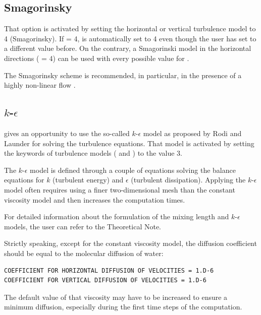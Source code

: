 \subsection{Smagorinsky}

That option is activated by setting the horizontal or vertical turbulence
model to 4 (Smagorinsky).
If  = 4,
 is automatically set to 4
even though the user has set to a different value before.
On the contrary, a Smagorinski model in the horizontal directions
( = 4) can be used with every possible
value for .

The Smagorinsky scheme is recommended, in particular, in the presence of a
highly non-linear flow \cite{Smagorinsky1963}.


\subsection{$k$-$\epsilon$}

 gives an opportunity to use the so-called $k$-$\epsilon$
model as proposed by Rodi and Launder for solving the turbulence equations.
That model is activated by setting the keywords of turbulence models
( and )
to the value 3.

The $k$-$\epsilon$ model is defined through a couple of equations
solving the balance equations for $k$ (turbulent energy) and $\epsilon$
(turbulent dissipation). Applying the $k$-$\epsilon$ model often
requires using a finer two-dimensional mesh than the constant viscosity model
and then increases the computation times.

For detailed information about the formulation of the mixing length and
$k$-$\epsilon$ models, the user can refer to the  Theoretical
Note.

Strictly speaking, except for the constant viscosity model, the diffusion
coefficient should be equal to the molecular diffusion of water:

\begin{lstlisting}[language=TelemacCas]
COEFFICIENT FOR HORIZONTAL DIFFUSION OF VELOCITIES = 1.D-6
COEFFICIENT FOR VERTICAL DIFFUSION OF VELOCITIES = 1.D-6
\end{lstlisting}

The default value of that viscosity may have to be increased to ensure a minimum
diffusion, especially during the first time steps of the computation.

